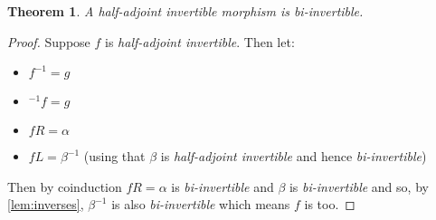 \documentclass{article}
\newtheorem{theorem}{Theorem}
\theoremstyle{definition}
\theoremstyle{examplestyle}
\newcommand{\linv}[1]{{}^{-1}\!#1}
\newcommand{\rinv}[1]{#1^{-1}}
\begin{document}
\begin{theorem}
  A \emph{half-adjoint invertible} morphism is \emph{bi-invertible}.
\end{theorem}
\begin{proof}
  Suppose \(f\) is \emph{half-adjoint invertible}. Then let:
  \begin{itemize}
  \item \(\rinv f = g\)
  \item \(\linv f = g\)
  \item \(fR = \alpha\)
  \item \(fL = \rinv \beta\) (using that \(\beta\) is \emph{half-adjoint invertible} and hence \emph{bi-invertible})
  \end{itemize}
  Then by coinduction \(fR = \alpha\) is \emph{bi-invertible} and \(\beta\) is \emph{bi-invertible} and so, by \cref{lem:inverses}, \(\rinv \beta\) is also \emph{bi-invertible} which means \(f\) is too.
\end{proof}
\end{document}
